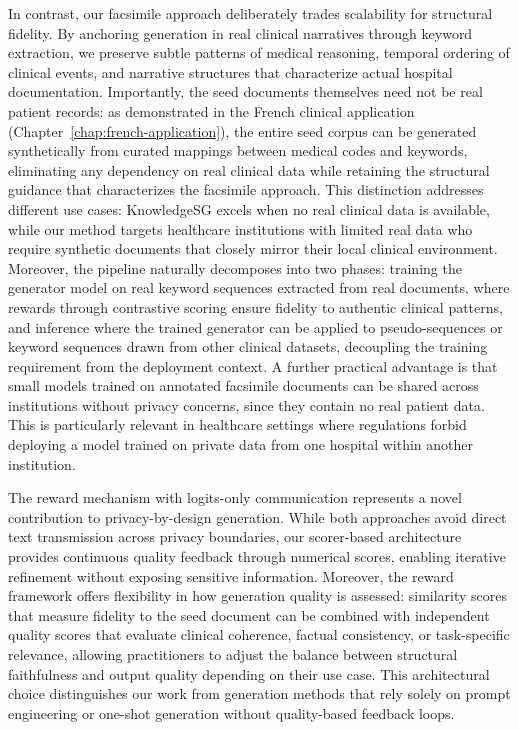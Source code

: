 In contrast, our facsimile approach deliberately trades scalability for structural fidelity.
By anchoring generation in real clinical narratives through keyword extraction, we preserve subtle patterns of medical reasoning, temporal ordering of clinical events, and narrative structures that characterize actual hospital documentation.
Importantly, the seed documents themselves need not be real patient records: as demonstrated in the French clinical application (Chapter~\ref{chap:french-application}), the entire seed corpus can be generated synthetically from curated mappings between medical codes and keywords, eliminating any dependency on real clinical data while retaining the structural guidance that characterizes the facsimile approach.
This distinction addresses different use cases: KnowledgeSG excels when no real clinical data is available, while our method targets healthcare institutions with limited real data who require synthetic documents that closely mirror their local clinical environment.
Moreover, the pipeline naturally decomposes into two phases: training the generator model on real keyword sequences extracted from real documents, where rewards through contrastive scoring ensure fidelity to authentic clinical patterns, and inference where the trained generator can be applied to pseudo-sequences or keyword sequences drawn from other clinical datasets, decoupling the training requirement from the deployment context.
A further practical advantage is that small models trained on annotated facsimile documents can be shared across institutions without privacy concerns, since they contain no real patient data.
This is particularly relevant in healthcare settings where regulations forbid deploying a model trained on private data from one hospital within another institution.

The reward mechanism with logits-only communication represents a novel contribution to privacy-by-design generation.
While both approaches avoid direct text transmission across privacy boundaries, our scorer-based architecture provides continuous quality feedback through numerical scores, enabling iterative refinement without exposing sensitive information.
Moreover, the reward framework offers flexibility in how generation quality is assessed: similarity scores that measure fidelity to the seed document can be combined with independent quality scores that evaluate clinical coherence, factual consistency, or task-specific relevance, allowing practitioners to adjust the balance between structural faithfulness and output quality depending on their use case.
This architectural choice distinguishes our work from generation methods that rely solely on prompt engineering or one-shot generation without quality-based feedback loops.

